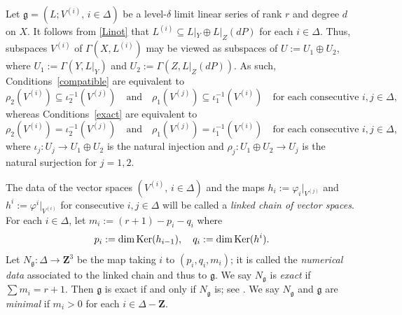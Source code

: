 \documentclass[a4paper,11pt]{amsart}
\theoremstyle{plain}
\theoremstyle{definition}
\theoremstyle{remark}
\def\Ker{{\rm Ker}}
\def\:{\colon}
\begin{document}

Let $\mathfrak g=(L;V^{(i)},\,i\in\Delta)$ be a level-$\delta$ limit linear series of rank $r$ and degree $d$ on $X$. It follows from \eqref{Linot} that 
$L^{(i)}\subseteq L|_Y\oplus L|_Z(dP)$ for each $i\in\Delta$. Thus, subspaces $V^{(i)}$ of $\Gamma(X, L^{(i)})$ may be viewed as subspaces of 
$U:=U_1\oplus U_2$, where $U_1:=\Gamma(Y,L|_Y)$ and $U_2:=\Gamma(Z,L|_Z(dP))$. As such, Conditions~\eqref{compatible} are equivalent to
\begin{equation}\label{compatible2}
\rho_2(V^{(i)})\subseteq\iota_2^{-1}(V^{(j)})
\quad\text{and}\quad
\rho_1(V^{(j)})\subseteq\iota_1^{-1}(V^{(i)})
\quad\text{for each consecutive }i,j\in\Delta,
\end{equation}
whereas Conditions~\eqref{exact} are equivalent to
\begin{equation}\label{exact2}
\rho_2(V^{(i)})=\iota_2^{-1}(V^{(j)})
\quad\text{and}\quad
\rho_1(V^{(j)})=\iota_1^{-1}(V^{(i)})
\quad\text{for each consecutive }i,j\in\Delta,
\end{equation}
where 
$\iota_j\: U_j\to U_1\oplus U_2$ is the natural injection and 
$\rho_j\: U_1\oplus U_2\to U_j$ is the natural surjection for $j=1,2$.

The data of the vector spaces $(V^{(i)},\,i\in\Delta)$ and the maps
$h_i:=\varphi_{i}|_{V^{(j)}}$ and 
$h^i:=\varphi^i|_{V^{(i)}}$ for consecutive $i,j\in\Delta$ 
will be called a \emph{linked chain of vector spaces}. For each $i\in\Delta$, 
let $m_i:=(r+1)-p_i-q_i$ where
$$
p_i:=\dim\Ker(h_{i-1}),\quad q_i:=\dim\Ker(h^i).
$$
Let $N_{\mathfrak g}\colon\Delta\to\mathbf Z^3$ be the map taking $i$ to $(p_i,q_i,m_i)$; it is called the \emph{numerical data} associated to the linked chain and thus to $\mathfrak g$. We say $N_{\mathfrak g}$ is \emph{exact} if $\sum m_i=r+1$. Then $\mathfrak g$ is exact if and only 
if $N_{\mathfrak g}$ is; see \cite[Prop. 3.6, p.~836]{ENR}. We say $N_{\mathfrak g}$ and $\mathfrak g$ are \emph{minimal} if $m_i>0$ for each $i\in\Delta-\mathbf Z$.
\end{document}
